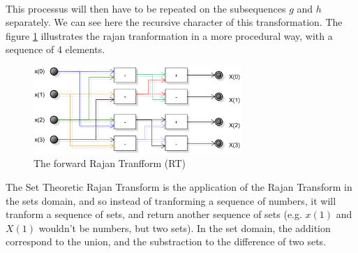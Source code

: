 ~~

This processus will then have to be repeated on the subsequences $g$ and $h$ separately. We can see here the recursive character of this transformation. The figure \ref{fig:diagram:flowchart:rajan} illustrates the rajan tranformation in a more procedural way, with a sequence of 4 elements. 

\begin{figure}[H]
	\centering
	\includegraphics[width=0.7\textwidth]{images/diagrams/flowchart_rajan_transform}
	\caption{The forward Rajan Tranfform (RT)}
	\label{fig:diagram:flowchart:rajan}	
\end{figure}


The Set Theoretic Rajan Transform is the application of the Rajan Transform in the sets domain, and so instead of tranforming a sequence of numbers, it will tranform a sequence of sets, and return another sequence of sets (e.g. $x(1)$ and $X(1)$ wouldn't be numbers, but two sets). In the set domain, the addition correspond to the union, and the substraction to the difference of two sets.




